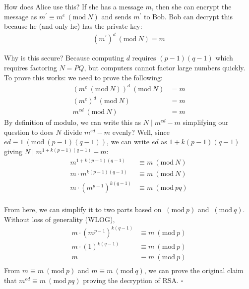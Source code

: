 \documentclass[14pt]{extarticle}
\newcommand{\Mod}[1]{\ (\mathrm{mod}\ #1)}
\begin{document}
    How does Alice use this? If she has a message $m$, then she can encrypt the
    message as $m^\prime \equiv m^e \Mod{N}$ and sends $m^\prime$ to Bob.
    Bob can decrypt this because he (and only he) has the private key:
    \begin{align*}
        (m^\prime)^d \Mod{N} = m
    \end{align*}

    Why is this secure? Because computing $d$ requires $(p-1)(q-1)$ which 
    requires factoring $N = PQ$, but computers cannot factor large numbers
    quickly.\\

    To prove this works: we need to prove the following:
    \begin{align*}
        \left(m^e \Mod{N}\right)^d \Mod{N} &= m         \\
        (m^e)^d \Mod{N}                    &= m         \\
        m^{ed} \Mod{N}                    &= m
    \end{align*}
    By definition of modulo, we can write this as $N \mid m^{ed} - m$
    simplifying our question to does $N$ divide $m^{ed} - m$ evenly? Well,
    since $ed \equiv 1 \Mod{(p-1)(q-1)}$, we can write $ed$ as
    $1 + k(p-1)(q-1)$ giving $N\mid m^{1 + k(p-1)(q-1)} - m$:
    \begin{align*}
        m^{1 + k(p-1)(q-1)}         &\equiv m \Mod{N}           \\
        m\cdot m^{k(p-1)(q-1)}      &\equiv m \Mod{N}           \\
        m\cdot (m^{p-1})^{k(q-1)}   &\equiv m \Mod{pq}          \\
    \end{align*}
    
    From here, we can simplify it to two parts based on $\Mod{p}$ and 
    $\Mod{q}$. Without loss of generality (WLOG),
    \begin{align*}
        m\cdot (m^{p-1})^{k(q-1)}   &\equiv m \Mod{p}           \\
        m\cdot (1)^{k(q-1)}         &\equiv m \Mod{p}           \\
        m                           &\equiv m \Mod{p}           \\
    \end{align*}
    From $m\equiv m\Mod{p}$ and $m\equiv m\Mod{q}$, we can prove the original
    claim that $m^{ed}\equiv m\Mod{pq}$ proving the decryption of RSA.
    \hfill
    $\square$
\end{document}
